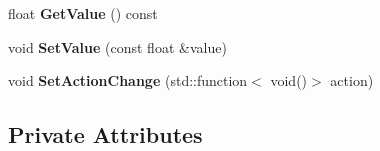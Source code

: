 \begin{DoxyCompactItemize}
\item 
\mbox{\label{class_flounder_1_1_input_slider_a3e4a3c8e4eb29452780ff176cf67591c}} 
float {\bfseries Get\+Value} () const
\item 
\mbox{\label{class_flounder_1_1_input_slider_ac6f267533d3eedbed62e0f9d23150b51}} 
void {\bfseries Set\+Value} (const float \&value)
\item 
\mbox{\label{class_flounder_1_1_input_slider_ac12f37eb916a5715d46f02d427d399c5}} 
void {\bfseries Set\+Action\+Change} (std\+::function$<$ void()$>$ action)
\end{DoxyCompactItemize}
\subsection*{Private Attributes}
